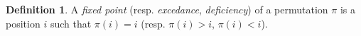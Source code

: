 \documentclass[
final
]{dmtcs-episciences}
\theoremstyle{definition}
\newtheorem{definition}[theorem]{Definition}
\newtheorem{example}[theorem]{Example}
\theoremstyle{remark}
\begin{document}
%
%
%

\begin{definition}
A \emph{fixed point} (resp. \emph{excedance}, \emph{deficiency}) of a permutation $\pi$ is a position $i$ such that $\pi(i) =  i$ (resp. $\pi(i) > i$, $\pi(i) <  i$).
\end{definition}
%
%
\end{document}
